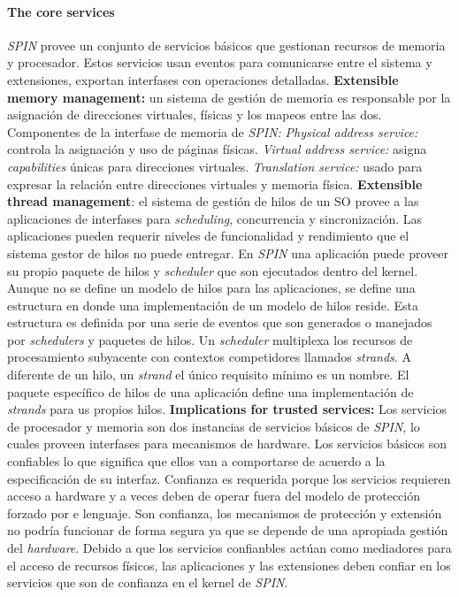 \paragraph{\textnormal{\textbf{The core services}}}
\textit{SPIN} provee un conjunto de servicios básicos que gestionan recursos de memoria y procesador. Estos servicios usan eventos para comunicarse entre el sistema y extensiones, exportan interfases con operaciones detalladas. \textbf{Extensible memory management:} un sistema de gestión de memoria es responsable por la asignación de direcciones virtuales, físicas y los mapeos entre las dos. Componentes de la interfase de memoria de \textit{SPIN:} \textit{Physical address service:} controla la asignación y uso de páginas físicas. \textit{Virtual address service:} asigna \textit{capabilities} únicas para direcciones virtuales. \textit{Translation service:} usado para expresar la relación entre direcciones virtuales y memoria física. \textbf{Extensible thread management}: el sistema de gestión de hilos de un SO provee a las aplicaciones de interfases para \textit{scheduling}, concurrencia y sincronización. Las aplicaciones pueden requerir niveles de funcionalidad y rendimiento que el sistema gestor de hilos no puede entregar. En \textit{SPIN} una aplicación puede proveer su propio paquete de hilos y \textit{scheduler} que son ejecutados dentro del kernel. Aunque no se define un modelo de hilos para las aplicaciones, se define una estructura en donde una implementación de un modelo de hilos reside. Esta estructura es definida por una serie de eventos que son generados o manejados por \textit{schedulers} y paquetes de hilos. Un \textit{scheduler} multiplexa los recursos de procesamiento subyacente con contextos competidores llamados \textit{strands}. A diferente de un hilo, un \textit{strand} el único requisito mínimo es un nombre. El paquete específico de hilos de una aplicación define una implementación de \textit{strands} para us propios hilos. \textbf{Implications for trusted services:} Los servicios de procesador y memoria son dos instancias de servicios básicos de \textit{SPIN}, lo cuales proveen interfases para mecanismos de hardware. Los servicios básicos son confiables lo que significa que ellos van a comportarse de acuerdo a la especificación de su interfaz. Confianza es requerida porque los servicios requieren acceso a hardware y a veces deben de operar fuera del modelo de protección forzado por e lenguaje. Son confianza, los mecanismos de protección y extensión no podría funcionar de forma segura ya que se depende de una apropiada gestión del \textit{hardware}. Debido a que los servicios confianbles actúan como mediadores para el acceso de recursos físicos, las aplicaciones y las extensiones deben confiar en los servicios que son de confianza en el kernel de \textit{SPIN}.

